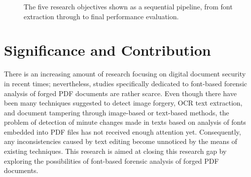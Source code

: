 \begin{figure}[H]
    \centering
    \caption{The five research objectives shown as a sequential pipeline, from font extraction through to final performance evaluation.}
    \label{fig:objectives_pipeline}
\end{figure}

\section{Significance and Contribution}

There is an increasing amount of research focusing on digital document security in recent times; nevertheless, studies specifically dedicated to font-based forensic analysis of forged PDF documents are rather scarce. Even though there have been many techniques suggested to detect image forgery, OCR text extraction, and document tampering through image-based or text-based methods, the problem of detection of minute changes made in texts based on analysis of fonts embedded into PDF files has not received enough attention yet. Consequently, any inconsistencies caused by text editing become unnoticed by the means of existing techniques. This research is aimed at closing this research gap by exploring the possibilities of font-based forensic analysis of forged PDF documents.\\

